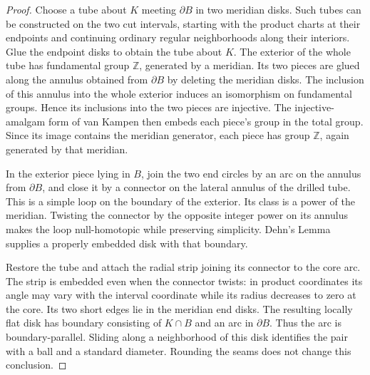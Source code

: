 \documentclass[11pt]{article}
\numberwithin{equation}{section}
\theoremstyle{definition}
\theoremstyle{remark}
\begin{document}
\begin{proof}
Choose a tube about $K$ meeting $\partial B$ in two meridian disks.
Such tubes can be constructed on the two cut intervals, starting with
the product charts at their endpoints and continuing ordinary regular
neighborhoods along their interiors.  Glue the endpoint disks to obtain
the tube about $K$.  The exterior of the whole tube has fundamental
group $\mathbb Z$, generated by a meridian.  Its two pieces are glued
along the annulus obtained from $\partial B$ by deleting the meridian
disks.  The inclusion of this annulus into the whole exterior induces
an isomorphism on fundamental groups.  Hence its inclusions into the
two pieces are injective.  The injective-amalgam form of van Kampen
then embeds each piece's group in the total group.  Since its image
contains the meridian generator, each piece has group $\mathbb Z$,
again generated by that meridian.

In the exterior piece lying in $B$, join the two end circles by an arc
on the annulus from $\partial B$, and close it by a connector on the
lateral annulus of the drilled tube.  This is a simple loop on the
boundary of the exterior.  Its class is a power of the meridian.
Twisting the connector by the opposite integer power on its annulus
makes the loop null-homotopic while preserving simplicity.  Dehn's
Lemma supplies a properly embedded disk with that boundary.

Restore the tube and attach the radial strip joining its connector to
the core arc.  The strip is embedded even when the connector twists:
in product coordinates its angle may vary with the interval coordinate
while its radius decreases to zero at the core.  Its two short edges
lie in the meridian end disks.  The resulting locally flat disk has
boundary consisting of $K\cap B$ and an arc in $\partial B$.  Thus the
arc is boundary-parallel.  Sliding along a neighborhood of this disk
identifies the pair with a ball and a standard diameter.  Rounding the
seams does not change this conclusion.
\end{proof}
\end{document}
